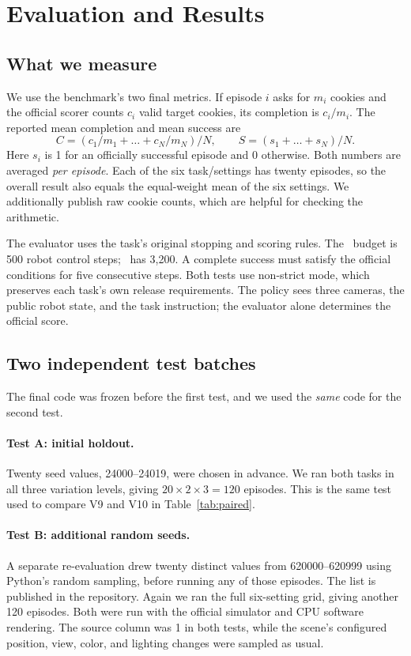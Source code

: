 \section{Evaluation and Results}
\label{sec:evaluation}
\subsection{What we measure}
We use the benchmark's two final metrics. If episode $i$ asks for $m_i$ cookies and the official scorer counts $c_i$ valid target cookies, its completion is $c_i/m_i$. The reported mean completion and mean success are
\begin{equation}
\label{eq:metrics}
C=(c_1/m_1+\ldots+c_N/m_N)/N,
\qquad S=(s_1+\ldots+s_N)/N.
\end{equation}
Here $s_i$ is 1 for an officially successful episode and 0 otherwise. Both numbers are averaged \emph{per episode}. Each of the six task/settings has twenty episodes, so the overall result also equals the equal-weight mean of the six settings. We additionally publish raw cookie counts, which are helpful for checking the arithmetic.

The evaluator uses the task's original stopping and scoring rules. The \pFive\ budget is 500 robot control steps; \pTen\ has 3,200. A complete success must satisfy the official conditions for five consecutive steps. Both tests use non-strict mode, which preserves each task's own release requirements. The policy sees three cameras, the public robot state, and the task instruction; the evaluator alone determines the official score.

\subsection{Two independent test batches}
The final code was frozen before the first test, and we used the \emph{same} code for the second test.

\paragraph{Test A: initial holdout.}
Twenty seed values, 24000--24019, were chosen in advance. We ran both tasks in all three variation levels, giving $20\times2\times3=120$ episodes. This is the same test used to compare V9 and V10 in Table~\ref{tab:paired}.

\paragraph{Test B: additional random seeds.}
A separate re-evaluation drew twenty distinct values from 620000--620999 using Python's random sampling, before running any of those episodes. The list is published in the repository. Again we ran the full six-setting grid, giving another 120 episodes. Both were run with the official simulator and CPU software rendering. The source column was 1 in both tests, while the scene's configured position, view, color, and lighting changes were sampled as usual.

